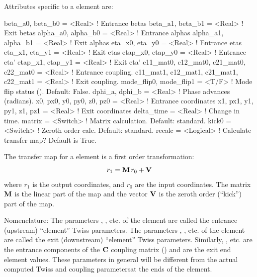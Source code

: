 {Attributes specific to a  element are:
\begin{example}
  beta_a0, beta_b0   = <Real>            ! Entrance betas
  beta_a1, beta_b1   = <Real>            ! Exit betas
  alpha_a0, alpha_b0 = <Real>            ! Entrance alphas
  alpha_a1, alpha_b1 = <Real>            ! Exit alphas
  eta_x0, eta_y0     = <Real>            ! Entrance etas 
  eta_x1, eta_y1     = <Real>            ! Exit etas 
  etap_x0, etap_y0   = <Real>            ! Entrance eta' 
  etap_x1, etap_y1   = <Real>            ! Exit eta'
  c11_mat0, c12_mat0, c21_mat0, c22_mat0 = <Real>  ! Entrance coupling.
  c11_mat1, c12_mat1, c21_mat1, c22_mat1 = <Real>  ! Exit coupling.
  mode_flip0, mode_flip1 = <T/F>         ! Mode flip status (). Default: False.
  dphi_a, dphi_b            = <Real>     ! Phase advances (radians).
  x0, px0, y0, py0, z0, pz0 = <Real>     ! Entrance coordinates
  x1, px1, y1, py1, z1, pz1 = <Real>     ! Exit coordinates
  delta_time                = <Real>     ! Change in time.
  matrix                    = <Switch>   ! Matrix calculation. Default: standard.
  kick0                     = <Switch>   ! Zeroth order calc. Default: standard.
  recalc                    = <Logical>  ! Calculate transfer map? Default is True.
\end{example}

The transfer map for a  element is a first order transformation:
\begin{equation}
  r_1 = {\bf M} \, r_0 + {\bf V} 
\end{equation}
where $r_1$ is the output coordinates, and $r_0$ are the input coordinates. The matrix ${\bf M}$ is
the linear part of the map and the vector ${\bf V}$ is the zeroth order (``kick'') part of the map.

Nomenclature: The parameters , , etc. of the  element are called
the entrance (upstream) ``element'' Twiss parameters. The parameters , ,
etc. of the  element are called the exit (downstream) ``element'' Twiss
parameters. Similarly, , etc. are the entrance components of the ${\bf C}$ coupling
matrix () and  are the exit end element values. These parameters in
general will be different from the actual computed Twiss and coupling parametersat the ends of the
 element.

}
